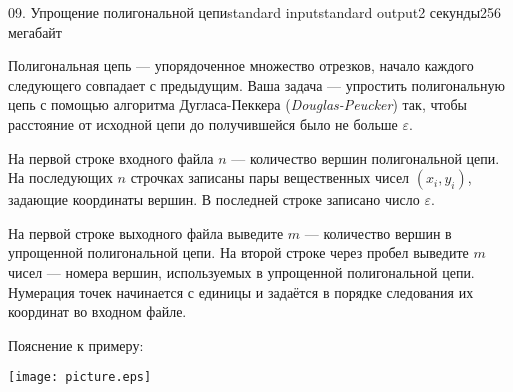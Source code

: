 \begin{problem}{09. Упрощение полигональной цепи}{standard input}{standard output}{2 секунды}{256 мегабайт}

Полигональная цепь — упорядоченное множество отрезков, начало каждого следующего совпадает с предыдущим.
Ваша задача — упростить полигональную цепь с помощью алгоритма Дугласа-Пеккера (\emph{Douglas-Peucker}) так,
чтобы расстояние от исходной цепи до получившейся было не больше $\varepsilon$.


\InputFile

На первой строке входного файла $n$ — количество вершин полигональной цепи.
На последующих $n$ строчках записаны пары вещественных чисел $(x_i, y_i)$, задающие координаты вершин.
В последней строке записано число $\varepsilon$.

\OutputFile

На первой строке выходного файла выведите $m$ — количество вершин в упрощенной полигональной цепи.
На второй строке через пробел выведите $m$ чисел — номера вершин, используемых в упрощенной полигональной цепи.
Нумерация точек начинается с единицы и задаётся в порядке следования их координат во входном файле.

\Examples

\begin{example}%
%
\end{example}
\Note
Пояснение к примеру:
	\begin{center}
		\texttt{[image: picture.eps]}
	\end{center}
\end{problem}